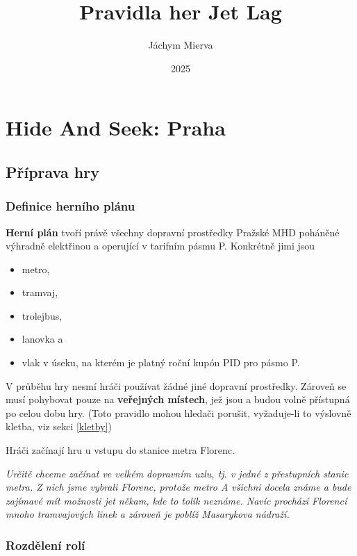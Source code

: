 \documentclass{book}
\title{Pravidla her Jet Lag}
\author{Jáchym Mierva}
\date{2025}
\newenvironment{reasoning}{\begin{small}\itshape}{\end{small}}
\begin{document}
\maketitle
\tableofcontents

\chapter{Hide And Seek: Praha}

\section{Příprava hry}

\subsection{Definice herního plánu}\label{herní plán}

\textbf{Herní plán} tvoří právě všechny dopravní prostředky Pražské MHD poháněné výhradně elektřinou a operující v tarifním pásmu P. Konkrétně jimi jsou
\begin{itemize}[nosep]
	\item metro,
	\item tramvaj,
	\item trolejbus,
	\item lanovka a
	\item vlak v úseku, na kterém je platný roční kupón PID pro pásmo P.
\end{itemize}
V průběhu hry nesmí hráči používat žádné jiné dopravní prostředky. Zároveň se musí pohybovat pouze na \textbf{veřejných místech}, jež jsou a budou volně přístupná po celou dobu hry. (Toto pravidlo mohou hledači porušit, vyžaduje-li to výslovně kletba, viz sekci \ref{kletby})

Hráči začínají hru u vstupu do stanice metra Florenc.

\begin{reasoning}
	Určitě chceme začínat ve velkém dopravním uzlu, tj. v jedné z přestupních stanic metra. Z nich jsme vybrali Florenc, protože metro A všichni docela známe a bude zajímavé mít možnosti jet někam, kde to tolik neznáme. Navíc prochází Florencí mnoho tramvajových linek a zároveň je poblíž Masarykova nádraží.
\end{reasoning}

\subsection{Rozdělení rolí}
\end{document}
